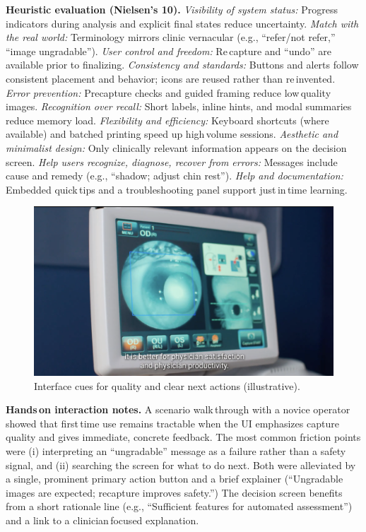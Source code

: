 \documentclass[sigplan,screen]{acmart}
\begin{document}
\textbf{Heuristic evaluation (Nielsen’s 10).} \emph{Visibility of system status:} Progress indicators during analysis and explicit final states reduce uncertainty. \emph{Match with the real world:} Terminology mirrors clinic vernacular (e.g., “refer/not refer,” “image ungradable”). \emph{User control and freedom:} Re\,capture and “undo” are available prior to finalizing. \emph{Consistency and standards:} Buttons and alerts follow consistent placement and behavior; icons are reused rather than re\,invented. \emph{Error prevention:} Precapture checks and guided framing reduce low\,quality images. \emph{Recognition over recall:} Short labels, inline hints, and modal summaries reduce memory load. \emph{Flexibility and efficiency:} Keyboard shortcuts (where available) and batched printing speed up high\,volume sessions. \emph{Aesthetic and minimalist design:} Only clinically relevant information appears on the decision screen. \emph{Help users recognize, diagnose, recover from errors:} Messages include cause and remedy (e.g., “shadow; adjust chin rest”). \emph{Help and documentation:} Embedded quick\,tips and a troubleshooting panel support just\,in\,time learning\cite{nielsen2020usability}.

\begin{figure}[htbp]
\centering
\includegraphics[width=.8\columnwidth]{Figure1.png}
\caption{Interface cues for quality and clear next actions (illustrative).}
\label{fig:ui}
\end{figure}

\textbf{Hands\,on interaction notes.} A scenario walk\,through with a novice operator showed that first\,time use remains tractable when the UI emphasizes capture quality and gives immediate, concrete feedback. The most common friction points were (i) interpreting an “ungradable” message as a failure rather than a safety signal, and (ii) searching the screen for what to do next. Both were alleviated by a single, prominent primary action button and a brief explainer (“Ungradable images are expected; recapture improves safety.”) The decision screen benefits from a short rationale line (e.g., “Sufficient features for automated assessment”) and a link to a clinician\,focused explanation.
\end{document}
